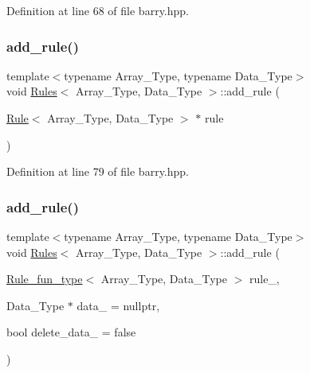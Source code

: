 Definition at line 68 of file barry.\+hpp.

\mbox{\label{classbarry_1_1_rules_abd60b1d381ad0c8a772e4d81264bbe0a}} 
\subsubsection{\texorpdfstring{add\+\_\+rule()}{add\_rule()}\hspace{0.1cm}{\footnotesize\ttfamily [2/3]}}
{\footnotesize\ttfamily template$<$typename Array\+\_\+\+Type, typename Data\+\_\+\+Type$>$ \\
void \hyperlink{classbarry_1_1_rules}{Rules}$<$ Array\+\_\+\+Type, Data\+\_\+\+Type $>$\+::add\+\_\+rule (\begin{DoxyParamCaption}\item[{\hyperlink{classbarry_1_1_rule}{Rule}$<$ Array\+\_\+\+Type, Data\+\_\+\+Type $>$ $\ast$}]{rule }\end{DoxyParamCaption})\hspace{0.3cm}{\ttfamily [inline]}}



Definition at line 79 of file barry.\+hpp.

\mbox{\label{classbarry_1_1_rules_abbc63747014445b538384bb500464bb5}} 
\subsubsection{\texorpdfstring{add\+\_\+rule()}{add\_rule()}\hspace{0.1cm}{\footnotesize\ttfamily [3/3]}}
{\footnotesize\ttfamily template$<$typename Array\+\_\+\+Type, typename Data\+\_\+\+Type$>$ \\
void \hyperlink{classbarry_1_1_rules}{Rules}$<$ Array\+\_\+\+Type, Data\+\_\+\+Type $>$\+::add\+\_\+rule (\begin{DoxyParamCaption}\item[{\hyperlink{namespacebarry_a3b914cb0dafdd5e5c19d142e8fa96c92}{Rule\+\_\+fun\+\_\+type}$<$ Array\+\_\+\+Type, Data\+\_\+\+Type $>$}]{rule\+\_\+,  }\item[{Data\+\_\+\+Type $\ast$}]{data\+\_\+ = {\ttfamily nullptr},  }\item[{bool}]{delete\+\_\+data\+\_\+ = {\ttfamily false} }\end{DoxyParamCaption})\hspace{0.3cm}{\ttfamily [inline]}}



